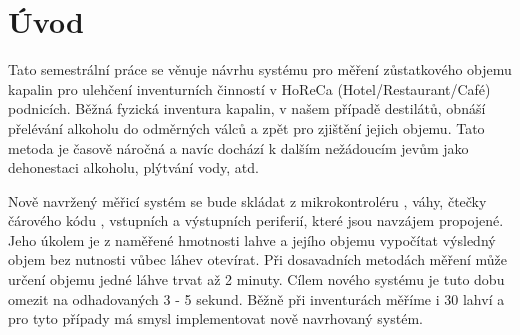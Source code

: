 \chapter*{Úvod}
{}

Tato semestrální práce se věnuje návrhu systému pro měření zůstatkového objemu kapalin pro ulehčení inventurních činností v HoReCa (Hotel/Restaurant/Café) podnicích. Běžná fyzická inventura kapalin, v našem případě destilátů, obnáší přelévání alkoholu do odměrných válců a zpět pro zjištění jejich objemu. Tato metoda je časově náročná a navíc dochází k dalším nežádoucím jevům jako dehonestaci alkoholu, plýtvání vody, atd.

Nově navržený měřicí systém se bude skládat z mikrokontroléru \cite{Raspberry pi}, váhy, čtečky čárového kódu \cite{Sensor for robots}, vstupních a výstupních periferií, které jsou navzájem propojené. Jeho úkolem je z naměřené hmotnosti lahve a jejího objemu vypočítat výsledný objem bez nutnosti vůbec láhev otevírat.
Při dosavadních metodách měření může určení objemu jedné láhve trvat až 2 minuty. Cílem nového systému je tuto dobu omezit na odhadovaných 3 - 5 sekund. Běžně při inventurách měříme i 30 lahví a pro tyto případy má smysl implementovat nově navrhovaný systém.







































%
%
%
